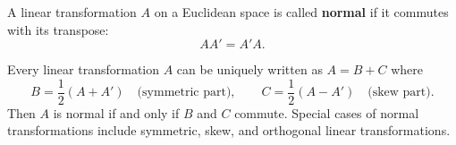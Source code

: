 A linear transformation $A$ on a Euclidean space is called \textbf{normal} if it commutes with its transpose:
$$AA' = A'A.$$

Every linear transformation $A$ can be uniquely written as $A = B + C$ where
$$B = \frac{1}{2}(A + A') \quad \text{(symmetric part)}, \qquad C = \frac{1}{2}(A - A') \quad \text{(skew part)}.$$
Then $A$ is normal if and only if $B$ and $C$ commute. Special cases of normal transformations include symmetric, skew, and orthogonal linear transformations.

